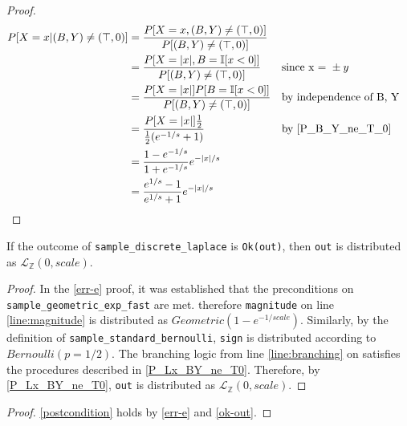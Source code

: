 \documentclass{article}
\begin{document}
\begin{proof}
\begin{align*}
P[X = x | (B, Y) \neq (\top, 0)] &= \frac{P[X = x, (B, Y) \neq (\top, 0)]}{P[(B, Y) \neq (\top, 0)]} \\
    &= \frac{P[X = |x|, B = \mathbb{I}[x < 0]]}{P[(B, Y) \neq (\top, 0)]} && \text{since x = }\pm y \\
    &= \frac{P[X = |x|] P[B = \mathbb{I}[x < 0]]}{P[(B, Y) \neq (\top, 0)]} && \text{by independence of B, Y} \\
    &= \frac{P[X = |x|] \frac{1}{2}}{\frac{1}{2} (e^{-1/s} + 1)} && \text{by } \ref{P_B_Y_ne_T_0} \\
    &= \frac{1 - e^{-1/s}}{1 + e^{-1/s}} e^{-|x|/s} \\
    &= \frac{e^{1/s} - 1}{e^{1/s} + 1} e^{-|x|/s} \\
\end{align*}
\end{proof}

\begin{lemma}\label{ok-out}
    If the outcome of \texttt{sample\_discrete\_laplace} is \texttt{Ok(out)},
    then \texttt{out} is distributed as $\mathcal{L}_\mathbb{Z}(0, scale)$.
\end{lemma}

\begin{proof}
    In the \ref{err-e} proof, it was established that the preconditions on \texttt{sample\_geometric\_exp\_fast} are met.
    therefore \texttt{magnitude} on line \ref{line:magnitude} is distributed as $ Geometric(1 - e^{-1/scale})$.
    Similarly, by the definition of \texttt{sample\_standard\_bernoulli}, \texttt{sign} is distributed according to $Bernoulli(p=1/2)$.
    The branching logic from line \ref{line:branching} on satisfies the procedures described in \ref{P_Lx_BY_ne_T0}.
    Therefore, by \ref{P_Lx_BY_ne_T0}, \texttt{out} is distributed as $\mathcal{L}_\mathbb{Z}(0, scale)$.
\end{proof}

\begin{proof}
    \ref{postcondition} holds by \ref{err-e} and \ref{ok-out}.
\end{proof}




\end{document}
